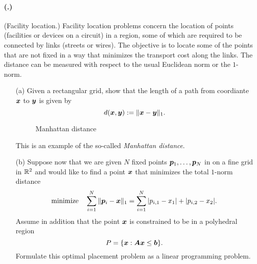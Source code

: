 \documentclass{article}
\newcounter{problemSheetNumber}
\newcounter{problems}
\renewcommand{\problem}{\paragraph{(\theproblemSheetNumber.\theproblems)}\addtocounter{problems}{1}}
\begin{document}
\problem (Facility location.) Facility location problems concern the location of points (facilities or devices on a circuit) in a region, some of which are required to be connected by links (streets or wires). The objective is to locate some of the points that are not fixed in a way that minimizes the transport cost along the links. The distance can be measured with respect to the usual Euclidean norm or the $1$-norm.

\begin{itemize}
 \item[(a)] Given a rectangular grid, show that the length of a path from coordiante $\bm{x}$ to $\bm{y}$ is given by
 \begin{equation*}
  d(\bm{x},\bm{y}) := \Vert {\bm{x}-\bm{y}}\Vert_1.
 \end{equation*}
 \begin{figure}[h!]
\centering
{}
\caption{Manhattan distance}\label{fig:triangle}
\end{figure}
This is an example of the so-called {\em Manhattan distance}.
\item[(b)] Suppose now that we are given $N$ fixed points $\bm{p}_1,\dots,\bm{p}_N$ in on a fine grid in $\mathbb{R}^2$ and would like to find
a point $\bm{x}$ that minimizes the total $1$-norm distance
\begin{equation*}
 \text{minimize}\quad \sum_{i=1}^N \Vert {\bm{p}_i-\bm{x}}\Vert_1 = \sum_{i=1}^N |p_{i,1}-x_1|+|p_{i,2}-x_2|.
\end{equation*}
Assume in addition that the point $\bm{x}$ is constrained to be in a polyhedral region
\begin{equation*}
 P = \{\bm{x} \mathrel{\mathop{:}} \bm{A}\bm{x}\leq \bm{b}\}.
\end{equation*}
Formulate this optimal placement problem as a linear programming problem.

\begin{figure}[h!]
\centering
{}
\end{figure}
\end{itemize}
\end{document}
